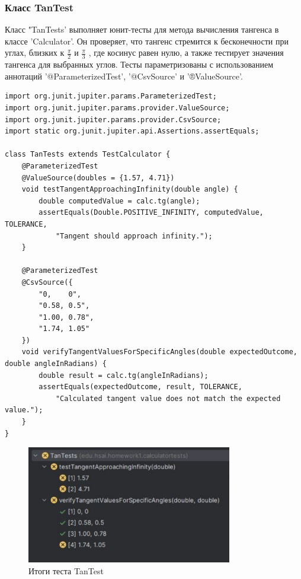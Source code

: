 \documentclass[areasetadvanced]{scrartcl}
\begin{document}
\subsubsection{Класс TanTest}
Класс "TanTests' выполняет юнит-тесты для метода вычисления тангенса в классе 'Calculator'. Он проверяет, что тангенс стремится к бесконечности при углах, близких к $\frac{\pi}{2}$ и $\frac{\pi}{3}$ , где косинус равен нулю, а также тестирует значения тангенса для выбранных углов. Тесты параметризованы с использованием аннотаций '@ParameterizedTest', '@CsvSource' и '®ValueSource'.
\begin{lstlisting}[caption={Класс TestCalculator}]
import org.junit.jupiter.params.ParameterizedTest;
import org.junit.jupiter.params.provider.ValueSource;
import org.junit.jupiter.params.provider.CsvSource;
import static org.junit.jupiter.api.Assertions.assertEquals;

class TanTests extends TestCalculator {
    @ParameterizedTest
    @ValueSource(doubles = {1.57, 4.71})
    void testTangentApproachingInfinity(double angle) {
        double computedValue = calc.tg(angle);
        assertEquals(Double.POSITIVE_INFINITY, computedValue, TOLERANCE,
            "Tangent should approach infinity.");
    }

    @ParameterizedTest
    @CsvSource({
        "0,    0",
        "0.58, 0.5",
        "1.00, 0.78",
        "1.74, 1.05"
    })
    void verifyTangentValuesForSpecificAngles(double expectedOutcome, double angleInRadians) {
        double result = calc.tg(angleInRadians);
        assertEquals(expectedOutcome, result, TOLERANCE,
            "Calculated tangent value does not match the expected value.");
    }
}
\end{lstlisting}
\begin{figure}[H]
	\centering
	\includegraphics[width=0.8\textwidth]{images/TanTes.png}
	\caption{Итоги теста TanTest}
	\label{fig:syntdiag}
\end{figure}
\end{document}
